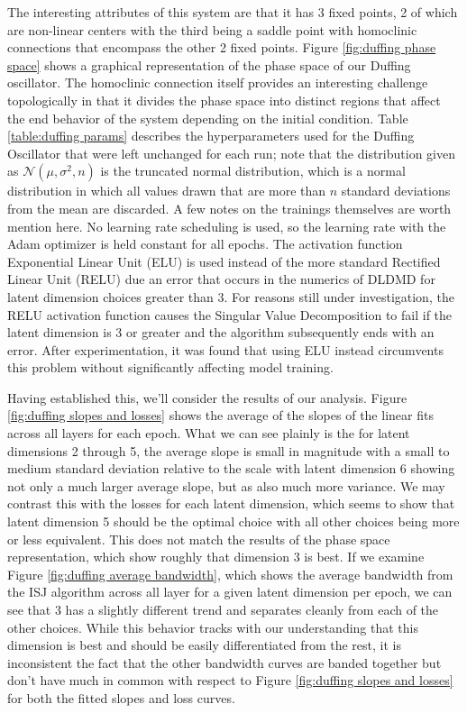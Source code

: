 The interesting attributes of this system are that it has 3 fixed points, 2 of which are non-linear 
centers with the third being a saddle point with homoclinic connections that encompass the other 2 fixed 
points. Figure \ref{fig:duffing phase space} shows a graphical representation of the phase space of our 
Duffing oscillator. The homoclinic connection itself provides an interesting challenge topologically in 
that it divides the phase space into distinct regions that affect the end behavior of the system depending
on the initial condition. Table \ref{table:duffing params} describes the hyperparameters used for the 
Duffing Oscillator that were left unchanged for each run; note that the distribution given as 
$\mathcal{N}(\mu, \sigma^2, n)$ is the truncated normal distribution, which is a normal distribution
in which all values drawn that are more than $n$ standard deviations from the mean are discarded. 
A few notes on the trainings themselves are worth mention here. No learning rate scheduling is used,
so the learning rate with the Adam optimizer is held constant for all epochs. The activation function
Exponential Linear Unit (ELU) is used instead of the more standard Rectified Linear Unit (RELU) due an 
error that occurs in the numerics of DLDMD for latent dimension choices greater than 3. For reasons still 
under investigation, the RELU activation function causes the Singular Value Decomposition to fail if the 
latent dimension is 3 or greater and the algorithm subsequently ends with an error. After experimentation, 
it was found that using ELU instead circumvents this problem without significantly affecting model training.

Having established this, we'll consider the results of our analysis.
Figure \ref{fig:duffing slopes and losses} shows the average of the slopes of the linear fits across 
all layers for each epoch.  What we can see plainly is the for latent dimensions 2 through 5, the average
slope is small in magnitude with a small to medium standard deviation relative to the scale with
latent dimension 6 showing not only a much larger average slope, but as also much more variance. We may 
contrast this with the losses for each latent dimension, which seems to show that latent dimension 5
should be the optimal choice with all other choices being more or less equivalent. This does not match
the results of the phase space representation, which show roughly that dimension 3 is best. 
If we examine Figure \ref{fig:duffing average bandwidth}, which shows the average bandwidth from the ISJ
algorithm across all layer for a given latent dimension per epoch, we can see that 3 has a slightly
different trend and separates cleanly from each of the other choices. While this behavior tracks with our 
understanding that this dimension is best and should be easily differentiated from the rest, it is 
inconsistent the fact that the other bandwidth curves are banded together but don't have much in common
with respect to Figure \ref{fig:duffing slopes and losses} for both the fitted slopes and loss curves.

